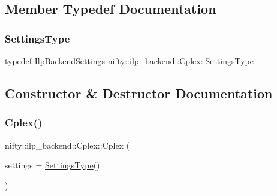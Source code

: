 \subsection{Member Typedef Documentation}
\mbox{\label{classnifty_1_1ilp__backend_1_1Cplex_a55f68efdbd0060526e09b037be4e6a49}} 
\subsubsection{\texorpdfstring{Settings\+Type}{SettingsType}}
{\footnotesize\ttfamily typedef \hyperlink{structnifty_1_1ilp__backend_1_1IlpBackendSettings}{Ilp\+Backend\+Settings} \hyperlink{classnifty_1_1ilp__backend_1_1Cplex_a55f68efdbd0060526e09b037be4e6a49}{nifty\+::ilp\+\_\+backend\+::\+Cplex\+::\+Settings\+Type}}



\subsection{Constructor \& Destructor Documentation}
\mbox{\label{classnifty_1_1ilp__backend_1_1Cplex_ab9abc60e704f82a5b7d480e4fab2e39f}} 
\subsubsection{\texorpdfstring{Cplex()}{Cplex()}}
{\footnotesize\ttfamily nifty\+::ilp\+\_\+backend\+::\+Cplex\+::\+Cplex (\begin{DoxyParamCaption}\item[{const \hyperlink{classnifty_1_1ilp__backend_1_1Cplex_a55f68efdbd0060526e09b037be4e6a49}{Settings\+Type} \&}]{settings = {\ttfamily \hyperlink{classnifty_1_1ilp__backend_1_1Cplex_a55f68efdbd0060526e09b037be4e6a49}{Settings\+Type}()} }\end{DoxyParamCaption})\hspace{0.3cm}{\ttfamily [inline]}}

\mbox{\label{classnifty_1_1ilp__backend_1_1Cplex_a5bebd6813a2fbb17fa2b5532c3d21000}} 
